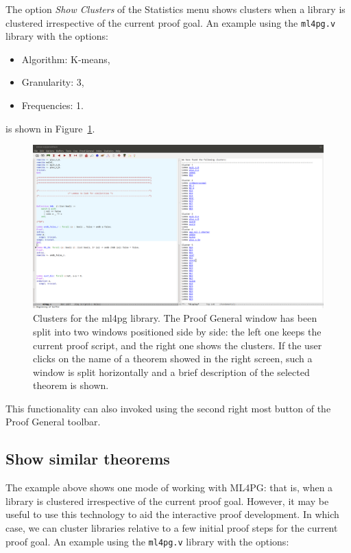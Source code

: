 \documentclass[10pt]{article}
\begin{document}
The option \emph{Show Clusters} of the Statistics menu shows clusters when a library is clustered
irrespective of the current proof goal. An example using the \verb"ml4pg.v" library with the options:

\begin{itemize}
 \item Algorithm: K-means,
 \item Granularity: 3,
 \item Frequencies: 1.
\end{itemize}

\noindent is shown in Figure~\ref{clusters1}.

\begin{figure}
 \centering
 \includegraphics[scale=0.23]{images/clusters1pg.png}
 \caption{Clusters for the ml4pg library. The Proof General window has been split into two windows positioned side by
side: the left one keeps the current proof script, and the right one shows the clusters. If the user clicks
on the name of a theorem showed in the right screen, such a window is split horizontally and a brief description of the selected
theorem is shown.}\label{clusters1}
\end{figure}

This functionality can also invoked using the second right most button of the Proof General toolbar.

\subsection{Show similar theorems}

The example above shows one mode of working with ML4PG: that is, when a library is clustered
irrespective of the current proof goal. However, it may be useful to use this technology to aid the interactive
proof development. In which case, we can cluster libraries relative to a few initial proof steps for the
current proof goal. An example using the \verb"ml4pg.v" library with the options:
\end{document}
